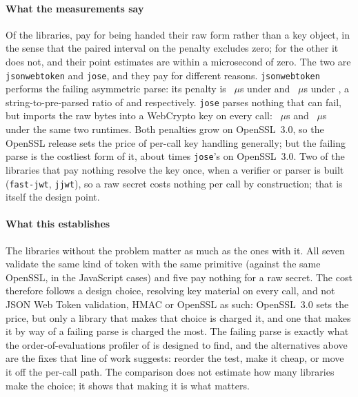 \documentclass[preprint,12pt,authoryear]{elsarticle}
\newcommand{\LibraryName}{\texttt{jsonwebtoken}}
\begin{document}
\paragraph{What the measurements say} Of the \XlibLibCount{} libraries,
\XlibPenaltyLibCount{} pay for being handed their raw form rather than a key
object, in the sense that the paired interval on the penalty excludes zero; for
the other \XlibZeroPenaltyLibCount{} it does not, and their point estimates are
within a microsecond of zero. The two are \LibraryName{} and \texttt{jose}, and
they pay for different reasons. \LibraryName{} performs the failing asymmetric
parse: its penalty is \XlibJsonwebtokenOldSslPenalty~$\mu$s under
\XlibJsonwebtokenOldSslBackend{} and \XlibJsonwebtokenNewSslPenalty~$\mu$s under
\XlibJsonwebtokenNewSslBackend, a string-to-pre-parsed ratio of
\XlibJsonwebtokenOldSslRatio{} and \XlibJsonwebtokenNewSslRatio{}
respectively. \texttt{jose} parses nothing that can fail, but imports the raw
bytes into a WebCrypto key on every call: \XlibJoseOldSslPenalty~$\mu$s and
\XlibJoseNewSslPenalty~$\mu$s under the same two runtimes. Both penalties grow
on OpenSSL~3.0, so the OpenSSL release sets the price of per-call key handling
generally; but the failing parse is the costliest form of it, about
\XlibJwtOverJoseOldSsl{} times \texttt{jose}'s on OpenSSL~3.0. Two of the
libraries that pay nothing resolve the key once, when a verifier or parser is
built (\texttt{fast-jwt}, \texttt{jjwt}), so a raw secret costs nothing per
call by construction; that is itself the design point.

\paragraph{What this establishes} The libraries without the problem matter as
much as the ones with it. All seven validate the same kind of token with the
same primitive (against the same OpenSSL, in the JavaScript cases) and
five pay nothing for a raw secret. The cost therefore follows a design choice,
resolving key material on every call, and not JSON Web Token validation, HMAC
or OpenSSL as such: OpenSSL~3.0 sets the price, but only a library that makes
that choice is charged it, and one that makes it by way of a failing parse is
charged the most. The failing parse is exactly what the order-of-evaluations
profiler of \citet{selakovic2017actionable} is designed to
find, and the alternatives above are the fixes that line of work suggests:
reorder the test, make it cheap, or move it off the per-call path. The
comparison does not estimate how many libraries make the choice; it shows that
making it is what matters.
\end{document}
